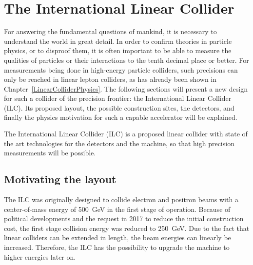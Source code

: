 \chapter{The International Linear Collider}
\label{ILC}
\begin{chapterabstract}
For answering the fundamental questions of mankind, it is necessary to understand the world in great detail.
In order to confirm theories in particle physics, or to disproof them, it is often important to be able to measure the qualities of particles or their interactions to the tenth decimal place or better.
For measurements being done in high-energy particle colliders, such precisions can only be reached in linear lepton colliders, as has already been shown in Chapter~\ref{LinearColliderPhysics}.
The following sections will present a new design for such a collider of the precision frontier: the International Linear Collider (ILC). 
Its proposed layout, the possible construction sites, the detectors, and finally the physics motivation for such a capable accelerator will be explained.
\end{chapterabstract}
\newline

The International Linear Collider (ILC) is a proposed linear \positron\electron collider with state of the art technologies for the detectors and the machine, so that high precision measurements will be possible.

\section{Motivating the layout}
\label{ILC:layout}
The ILC was originally designed to collide electron and positron beams with a center-of-mass energy of \SI{500}{\GeV} in the first stage of operation.
Because of political developments and the request in 2017 to reduce the initial construction cost, the first stage collision energy was reduced to \SI{250}{\GeV}.
Due to the fact that linear colliders can be extended in length, the beam energies can linearly be increased.
Therefore, the ILC has the possibility to upgrade the machine to higher energies later on.

